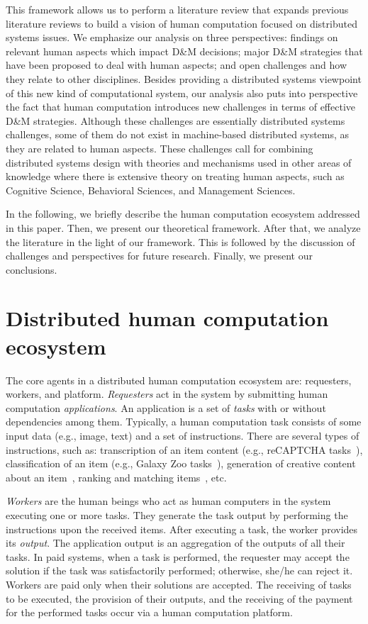 \documentclass[11pt]{bmc_article_s50}
\begin{document}
This framework allows us to perform a literature review that expands previous literature reviews to build a vision of human computation focused on distributed systems issues. We emphasize our analysis on three perspectives:  findings on relevant human aspects which impact D\&M decisions;  major D\&M strategies that have been proposed to deal with human aspects; and  open challenges and how they relate to other disciplines. Besides providing a distributed systems viewpoint of this new kind of computational system, our analysis also puts into perspective the fact that human computation introduces new challenges in terms of effective D\&M strategies. Although these challenges are essentially distributed systems challenges, some of them do not exist in machine-based distributed systems, as they are related to human aspects. These challenges call for combining distributed systems design with theories and mechanisms used in other areas of knowledge where there is extensive theory on treating human aspects, such as Cognitive Science, Behavioral Sciences, and Management Sciences.

In the following, we briefly describe the human computation ecosystem addressed in this paper. Then, we present our theoretical framework.  After that, we analyze the literature in the light of our framework. This is followed by the discussion of challenges and perspectives for future research. Finally, we present our conclusions.

\section{Distributed human computation ecosystem}
\label{sec:bgrw}

The core agents in a distributed human computation ecosystem are: requesters, workers, and platform. \textit{Requesters} act in the system by submitting human computation \textit{applications}. An application is a set of \textit{tasks} with or without dependencies among them. Typically, a human computation task consists of some input data (e.g., image, text) and a set of instructions. There are several types of instructions, such as: transcription of an item content (e.g., reCAPTCHA tasks~\cite{von:Science:2008}), classification of an item (e.g., Galaxy Zoo tasks~\cite{Lintott:2008}), generation of creative content about an item~\cite{Araujo:2013}, ranking and matching items~\cite{Marcus:2011}, etc.

\textit{Workers} are the human beings who act as human computers in the system executing one or more tasks. They generate the task output by performing the instructions upon the received items. After executing a task, the worker provides its \textit{output}. The application output is an aggregation of the outputs of all their tasks. In paid systems, when a task is performed, the requester may accept the solution if the task was satisfactorily performed; otherwise, she/he can reject it. Workers are paid only when their solutions are accepted. The receiving of tasks to be executed, the provision of their outputs, and the receiving of the payment for the performed tasks occur via a human computation platform.
\end{document}
